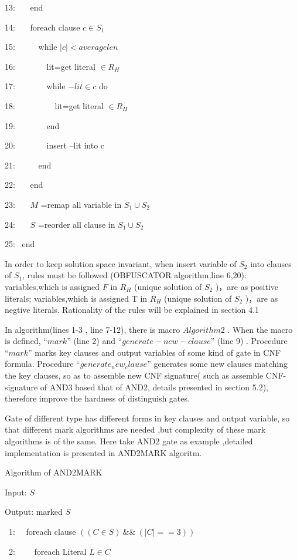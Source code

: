 \documentclass[runningheads,a4paper]{llncs}
\begin{document}
13:~~~  end 

14:~~~  foreach clause $ c \in S_1 $

15:~~~~~	    while $ |c| < averagelen $ 

16:~~~~~~~    	 lit=get literal $\in R_H$

17:~~~~~~~    	 while $-lit \in c$ do

18:~~~~~~~~~          lit=get literal $ \in R_H $

19:~~~~~~~        end 

20:~~~~~~~	      insert –lit into c

21:~~~~~     end 

22:~~~   end 

23:~~~   $M$ =remap all variable in $ S_1 \cup S_2$

24:~~~   $S$ =reorder all clause in $S_1 \cup S_2$

25:~  end



In order to keep solution space invariant, when insert variable of $S_2$ into clauses of $S_1$, rules must be followed (OBFUSCATOR algorithm,line 6,20):
variables,which is assigned $F$ in $R_H$ (unique solution of $S_2$ )，are as positive literals;
variables,which is assigned T in $R_H$ (unique solution of $S_2$ )，are as negtive literals. 
Rationality of the rules will be explained in section 4.1

In algorithm(lines 1-3 , line 7-12), there is macro $Algorithm2$ . When the macro is defined, $“mark”$ (line 2) and $“generate-new-clause”$ (line 9) . 
Procedure $“mark”$ marks key clauses and output variables of some kind of gate in CNF formula.
Procedure $“generate_new_clause”$ generates some new clauses matching the key clauses, so as to  assemble new CNF signature( such as assemble CNF-signature of AND3 based that of AND2, 
details presented in section 5.2), therefore improve the hardness of distinguish gates.

Gate of different type has different forms in key clauses and output variable, so that different mark algorithms are needed ,but complexity of these mark algorithms is of the same. 
Here take AND2 gate as example ,detailed implementation is presented in AND2MARK algoritm.  

\noindent Algorithm of AND2MARK

Input: $S$

Output: marked $S$ 

~1:~~  foreach clause $((C \in S) ~\&\&~ (|C|==3))$

~2:~~~~    foreach Literal $L \in C$ 
\end{document}
